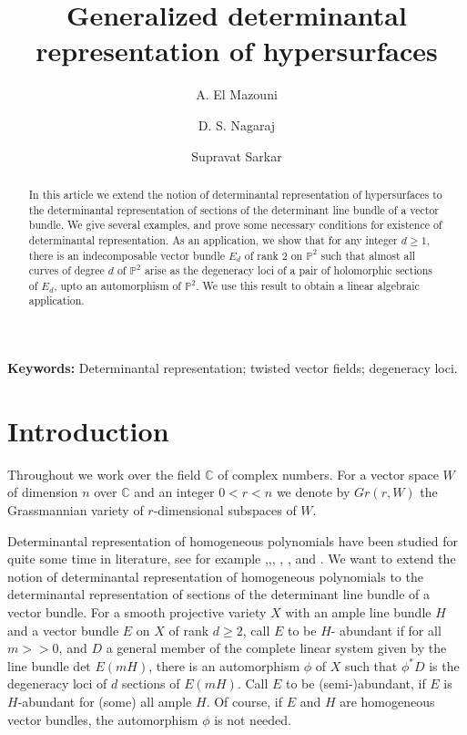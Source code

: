 \documentclass[11pt]{amsart}
\title{Generalized determinantal representation of hypersurfaces}
\author{A. El Mazouni}
\author{D. S. Nagaraj}
\author{Supravat Sarkar}
\theoremstyle{definition}
\begin{document}
\begin{abstract}  

In this article we extend the notion of determinantal representation of hypersurfaces 
to the determinantal representation of sections of the determinant line
bundle of a vector bundle. We give several examples, and prove some necessary 
conditions for existence of determinantal representation. As an application, 
we show that for any integer $d \geq 1,$ there is an 
indecomposable vector bundle $E_d$ of rank $2$ on $\mathbb{P}^2$ such that 
almost all curves of degree $d$ of $\mathbb{P}^2$ arise as the degeneracy
loci of a pair of holomorphic sections of  $E_d$, upto an automorphism of 
$\mathbb{P}^2$. We use this result to obtain a
linear algebraic application.
\end{abstract}

\maketitle
{\bf Keywords:} Determinantal representation; twisted vector fields; degeneracy loci.

\section{Introduction} \setcounter{page}{1} 
Throughout we work over the field $\mathbb{C}$ of complex numbers. 
For a vector space $W$ of dimension $n$  over $\mathbb{C}$ 
and an integer $0< r< n$ we denote by $Gr(r, W)$ the Grassmannian  
variety of $r$-dimensional subspaces of $W.$ 

Determinantal representation of homogeneous polynomials have been
studied for quite some time in literature, see for example 
\cite{beauville2000determinantal},\cite{branden2011obstructions},\cite{LuJu}, 
\cite{chiantini2014determinantal}, \cite{netzer2012polynomials}, 
\cite{quarez2012symmetric} and \cite{vinnikov1989complete}.
We want to extend the notion of determinantal representation of homogeneous 
polynomials to the determinantal representation of sections of the determinant line
bundle of a vector bundle. For a smooth projective variety $X$ with an ample line 
bundle $H$ and a vector bundle $E$ on $X$ of rank $d \geq 2$, call $E$ to be $H$-
abundant if for all $m>>0$, and $D$ a general member of the complete linear system
given by the line bundle $\textrm{det } E(mH)$, there is an automorphism $\phi$ of 
$X$ such that 
$\phi^* D$ is the degeneracy loci of $d$ sections of $E(mH)$. Call $E$ to be 
(semi-)abundant, if $E$ is $H$-abundant for (some) all ample $H$. Of course, if $E$ 
and $H$ are homogeneous vector bundles, the automorphism $\phi$ is not needed.
\end{document}
